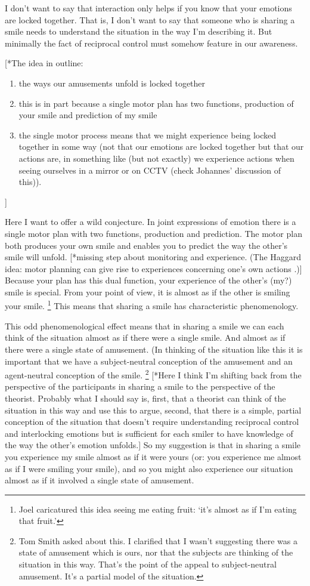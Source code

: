 \documentclass[12pt,\papersize]{extarticle}
\begin{document}
I don’t want to say that interaction only helps if you know that your emotions are locked together.
That is, I don’t want to say that  someone who is sharing a smile needs to understand the situation in the way I’m describing it.
But minimally the fact of reciprocal control must somehow feature in our awareness.

[*The idea in outline:
\begin{enumerate}
\item the ways our amusements unfold is locked together
\item this is in part because a single motor plan has two functions, production of your smile and prediction of my smile
\item the single motor process means that we might experience being locked together in some way (not that our emotions are locked together but that our actions are, in something like (but not exactly) we experience actions when seeing ourselves in a mirror or on CCTV (check Johannes’ discussion of this)).
\end{enumerate}
]

Here I want to offer a wild conjecture.
In joint expressions of emotion there is a single motor plan with two functions,
production and prediction.
The motor plan both produces your own smile and enables you to predict the way the other’s smile will unfold.
[*missing step about monitoring and experience.  (The Haggard idea: motor planning can give rise to experiences concerning one's own actions \citep{Haggard:2005sc}.)]
Because your plan has this dual function, your experience of the other’s (my?) smile is special.
From your point of view, it is almost as if the other is smiling your smile.%
\footnote{
Joel caricatured this idea seeing me eating fruit: ‘it’s almost as if I’m eating that fruit.’
}
This means that sharing a smile has characteristic phenomenology.

This odd phenomenological effect means that in sharing a smile we can each think of the situation almost as if there were a single smile.
And almost as if there were a single state of amusement.
(In thinking of the situation like this it is important that we have a subject-neutral conception of the amusement and an agent-neutral conception of the smile.%
\footnote{
Tom Smith asked about this.  I clarified that I wasn’t suggesting there was a state of amusement which is ours, nor that the subjects are thinking of the situation in this way.
That’s the point of the appeal to subject-neutral amusement.
It’s a partial model of the situation.
}
[*Here I think I’m shifting back from the perspective of the participants in sharing a smile to the perspective of the theorist.
Probably what I should say is, first, that a theorist can think of the situation in this way and use this to argue, second, that there is a simple, partial conception of the situation that doesn’t require understanding reciprocal control and interlocking emotions but is sufficient for each smiler to have knowledge of  the way the other’s emotion unfolds.]
So my suggestion is that in sharing a smile you experience my smile almost as if it were yours (or: you experience me almost as if I were smiling your smile),
and so you might also experience our situation almost as if it involved a single state of amusement.
\end{document}
